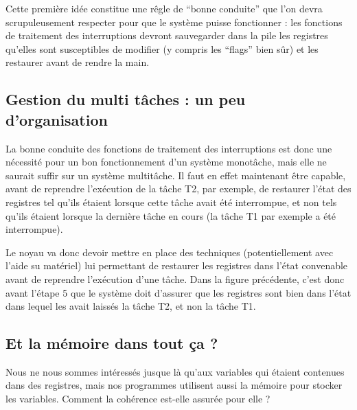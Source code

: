    Cette première idée constitue une rêgle de ``bonne conduite'' que
l'on devra scrupuleusement respecter pour que le système puisse
fonctionner : les fonctions de traitement des interruptions devront
sauvegarder dans la pile les registres qu'elles sont susceptibles de
modifier (y compris les ``flags'' bien sûr) et les restaurer avant de
rendre la main.

%
\subsection{Gestion du multi tâches : un peu d'organisation}

   La bonne conduite des fonctions de traitement des interruptions est
donc une nécessité pour un bon fonctionnement d'un système monotâche,
mais elle ne saurait suffir sur un système multitâche. Il faut en
effet maintenant être capable, avant de reprendre l'exécution de la
tâche T2, par exemple, de restaurer l'état des registres tel qu'ils
étaient lorsque cette tâche avait été interrompue, et non tels qu'ils
étaient lorsque la dernière tâche en cours (la tâche T1 par exemple a
été interrompue).

   Le noyau va donc devoir mettre en place des techniques
(potentiellement avec l'aide su matériel) lui permettant de restaurer
les registres dans l'état convenable avant de reprendre l'exécution
d'une tâche. Dans la figure précédente, c'est donc avant l'étape 5 que
le système doit d'assurer que les registres sont bien dans l'état dans
lequel les avait laissés la tâche T2, et non la tâche T1.

%
\subsection{Et la mémoire dans tout ça ?}

   Nous ne nous sommes intéressés jusque là qu'aux variables qui
étaient contenues dans des registres, mais nos programmes utilisent
aussi la mémoire pour stocker les variables. Comment la cohérence
est-elle assurée pour elle ?

%
